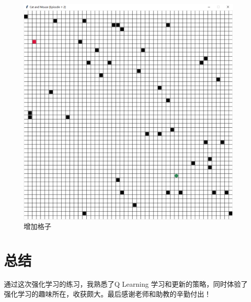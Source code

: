 \documentclass[UTF8, fontset=windows]{ctexart}
\begin{document}
\begin{figure}[H]
    \centering
    \includegraphics[width=.8\textwidth]{images/3.png}
    \caption{增加格子}
    \label{fig:3}
\end{figure}

\section{总结}

通过这次强化学习的练习，我熟悉了Q Learning 学习和更新的策略，同时体验了强化学习的趣味所在，收获颇大。最后感谢老师和助教的辛勤付出！
\end{document}
